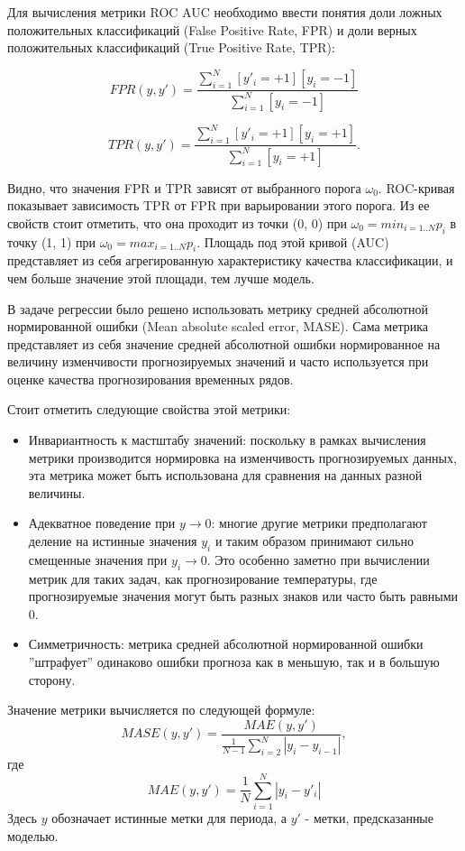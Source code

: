 Для вычисления метрики ROC AUC необходимо ввести понятия доли ложных положительных классификаций (False Positive Rate, FPR) и доли верных положительных классификаций (True Positive Rate, TPR):

$$
FPR(y,y') = \frac{\sum_{i=1}^N [y'_i = +1][y_i = -1]}{\sum_{i=1}^N [y_i = -1]}
$$

$$
TPR(y,y') = \frac{\sum_{i=1}^N [y'_i = +1][y_i = +1]}{\sum_{i=1}^N [y_i = +1]}.
$$

Видно, что значения FPR и TPR зависят от выбранного порога $\omega_0$. ROC-кривая показывает зависимость TPR от FPR при варьировании этого порога. Из ее свойств стоит отметить, что она проходит из точки (0, 0) при $\omega_0 = min_{i=1..N} p_i$ в точку (1, 1) при $\omega_0 = max_{i=1..N} p_i$. Площадь под этой кривой (AUC) представляет из себя агрегированную характеристику качества классификации, и чем больше значение этой площади, тем лучше модель.

В задаче регрессии было решено использовать метрику средней абсолютной нормированной ошибки (Mean absolute scaled error, MASE). Сама метрика представляет из себя значение средней абсолютной ошибки нормированное на величину изменчивости прогнозируемых значений и часто используется при оценке качества прогнозирования временных рядов.

Стоит отметить следующие свойства этой метрики:
\begin{itemize}
    \item Инвариантность к мастштабу значений: поскольку в рамках вычисления метрики производится нормировка на изменчивость прогнозируемых данных, эта метрика может быть использована для сравнения на данных разной величины.
    \item Адекватное поведение при $y \rightarrow 0$: многие другие метрики предполагают деление на истинные значения $y_i$ и таким образом принимают сильно смещенные значения при $y_i \rightarrow 0$. Это особенно заметно при вычислении метрик для таких задач, как прогнозирование температуры, где прогнозируемые значения могут быть разных знаков или часто быть равными 0.
    \item Симметричность: метрика средней абсолютной нормированной ошибки ''штрафует'' одинаково ошибки прогноза как в меньшую, так и в большую сторону.
\end{itemize}

Значение метрики вычисляется по следующей формуле:
$$
MASE(y, y') = \frac{MAE(y, y')}{\frac{1}{N-1}\sum_{i=2}^{N} |y_i - y_{i-1}|},
$$ где 
$$MAE(y, y') = \frac{1}{N}\sum_{i=1}^{N} |y_i - y'_i|$$
Здесь $y$ обозначает истинные метки для периода, а $y'$ - метки, предсказанные моделью.


